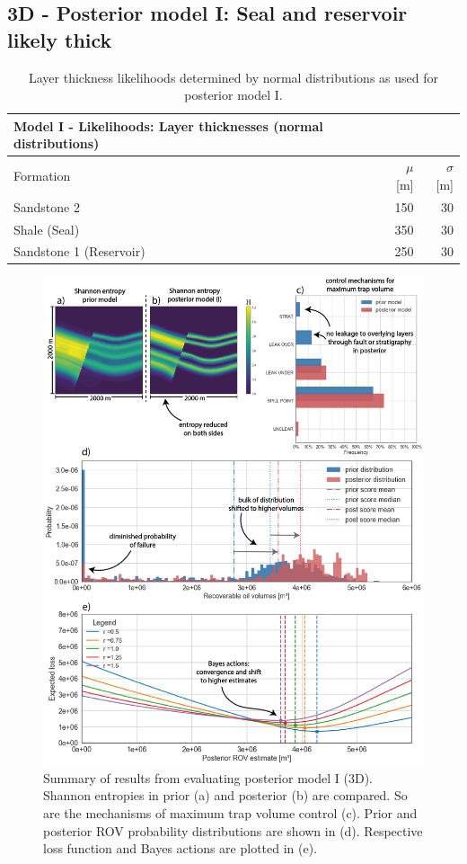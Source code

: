 		\subsection{3D - Posterior model I: Seal and reservoir likely thick}
		\begin{table}[h]
			\centering
			\begin{tabular}{lrr} 
				\toprule
				Model I - Likelihoods: Layer thicknesses (normal distributions)\\  
				\midrule 
				Formation & $\mu$ [m] & $\sigma$ [m]\\ 
				\midrule 
				Sandstone 2 & 150 & 30 \\
				Shale (Seal) & 350 & 30\\ 
				Sandstone 1 (Reservoir) & 250 & 30 \\
				\bottomrule
			\end{tabular}
			\caption{Layer thickness likelihoods determined by normal distributions as used for posterior model I.}
			\label{tab:ML1_likelihoods}
		\end{table}
		\begin{figure}[p!]
			\centering
			\includegraphics[width=1\textwidth]{Figures/ML1}
			\caption{Summary of results from evaluating posterior model I (3D). Shannon entropies in prior (a) and posterior (b) are compared. So are the mechanisms of maximum trap volume control (c). Prior and posterior ROV probability distributions are shown in (d). Respective loss function and Bayes actions are plotted in (e).}\label{fig:ML1}
		\end{figure}		
